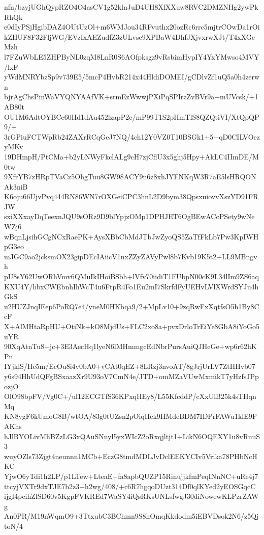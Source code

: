 nfn/bzyjUGhQypRZO4O4asCV1g52klnJuD4UH8XlXXuw8RVC2DMZNHg2ywPkRhQk
e0dIyPSjHgibDAZ4OUtUzOl+m6WMJou34RFvuthx20ozRc6rrc5mjtrCOwDa1rOi
kZHUF8F32FljWG/EVzIxAEZudfZ3zULvse9XPBaW4DhfJXjvxrwXJt/T4xXGcMzh
l7FZuWbLE5ZHPByNL0zqM8LnR0S6AOfpksgz9vRsbimHypIY4YxYMwso4MVY/lxF
yWdMNRYbzSp9v739E5/5mcP4HvbR214x44HldiDOMEI/gCDlvZf1uQ5a0h4zerwn
bjrAgChsPmWaVYQNYAAfVK+srmEzWwwjPXiPqSPIrzZvBVr9a+mUVcsk/+1AB80t
OU1M6AdtOYBCe60Hd1dAu452lzapP2c/mP99T1S2pHmTlS8QZQtiVI/XtQpQP9/+
3rGPiuFCTWpRb24ZAXrRCqGeJ7NQ/4ch12Y0VZ0T10BSGk1+5+qD0CILVOezyMKv
19DHmpH/PtCMa+b2yLNWyFkclALg9cH7zjCflU3x5ghj5Hpy+AkLC4IImDE/M0tw
9XfrYB7zHRpTVaCz5OhgTuu8GW98ACY9n6z8xhJYFNKqW3R7aE5lsHRQONAk3niB
K6oju66UjvPvq444RN86WN7rOXGeiCPC3hnL2D9bym38QpsxuiovvXszYD91FRJW
sxiXXxayDqTeexnJQU9sORz9D9blYpjzOMp1DPHJET6OgBEwACcPSety9wNeWZj6
wBqnLjsihGCgNCxRaePK+AysXBbCbMdJTbJwZyoQS5ZaTfFkLb7Pw3KpIWHpG3eo
mJGC9ao2jcksmOX23gipDEcIAiicV1nxZZyZAVyPwl8b7Kvb19K5t2+LL9MBngvh
pU8sY62UwORhVmv6QMuIkIHoiBSbh+lVfv70iidiT1FUbpN00cK9L34lIm9ZS6aq
KXU4Y/hbxCWEbnhIhWcT4u6FtpR4Fo1Eu2mI7SkrfdFyUEHvLVlXWrdSYJu4hGkS
u2HUZJnqIEep6PoRQ7e4/yneM0HKbqa9/2+MpLv10+9zqRwFxXqtfsO5h1By8CcF
X+AlMHtaRpHU+OtiNk+kO8MjdUs+FLC2xo8a+pvxDrloTrEiYe8GbA8iYoGo5uYR
90XqAtnTu8+jc+3E3AecHq1lyeN6lMHmmgcEdNbrPursAuiQJHeGe+wp6r62hKPn
IYjklS/Hc5m/EcOu8i4v0bA0+vCAt0qEZ+8LRzj3nvoAT/8gJrjUrLV7ZtHHvb07
y6s94HhUdQFgBSxaazXr9U93oV7CmN4e/JTD+omMZaVUwMxmikT7yHzfsJPpozjO
OlO98bpFV/Vg0C+/ul12ECGTfS36KPxqHEy8/L55KfcddP/cXxUlB25k4sTHqnMq
KN8ygF6kUmoG8B/wtOA/83g0tUZsn2pOiqHek9HMdeBDM7IDPrFAWu1klE9FAKhs
hJlBYOLivMhBZzLG3xQAuSNnyl5yxWIcZ2oRxqjltjt1+LikN6OQEXY1u8vRuuS3
wuyOZls73Zjgt4neunnn1MCb+EczG8tmdMDLJvDclEEKYCIv5Vrika78PHbNcHKC
YjwO6yTdi1h2LP/p1LTew+LteaE+fa8apbQUZP15RinujjkfmPeqINnNC+uRe4j7
ttcyjVXTr9dxTJE7b2z3+h2wg/408/+c6R7hgqoDUzt314Df0qlKYed2yEOSGqcC
ijgI4pcihZlSD60v5KgpFVKREd7WaSY4iQsRKsUNLsfwgJ30diNowewKLPzrZAWg
An0PR/M19nWqmO9+3TtxubC3BChmn9S8hOmqKkdodm5iEBVDsok2N6/z5QjtoN/4
